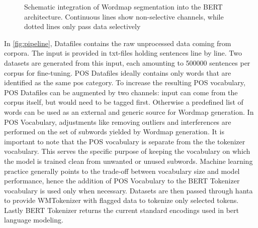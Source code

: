 \begin{figure}
    \caption[Schematic integration of Wordmap segmentation into the BERT architecture.]{Schematic integration of Wordmap segmentation into the BERT architecture. Continuous lines show non-selective channels, while dotted lines only pass data selectively}
    \label{fig:pipeline}
\end{figure}

In \autoref{fig:pipeline}, Datafiles contains the raw unprocessed data coming from corpora.
The input is provided in txt-files holding sentences line by line.
Two datasets are generated from this input, each amounting to 500000 sentences per corpus for fine-tuning.
POS Datafiles ideally contains only words that are identified as the same \ac{pos} category.
To increase the resulting POS vocabulary, POS Datafiles can be augmented by two channels: input can come from the corpus itself, but would need to be tagged first.
Otherwise a predefined list of words can be used as an external and generic source for Wordmap generation.
In POS Vocabulary, adjustments like removing outliers and interferences are performed on the set of subwords yielded by Wordmap generation.
It is important to note that the POS vocabulary is separate from the the tokenizer vocabulary.
This serves the specific purpose of keeping the vocabulary on which the model is trained clean from unwanted or unused subwords.
Machine learning practice generally points to the trade-off between vocabulary size and model performance, hence the addition of POS Vocabulary to the BERT Tokenizer vocabulary is used only when necessary.
Datasets are then passed through \ac{hanta} to provide WMTokenizer with flagged data to tokenize only selected tokens.
Lastly BERT Tokenizer returns the current standard encodings used in \ac{bert} language modeling.

